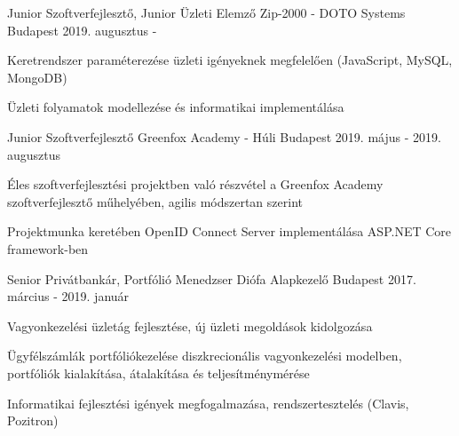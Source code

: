 

\begin{cventries}

  \cventry
    {Junior Szoftverfejlesztő, Junior Üzleti Elemző} %
    {Zip-2000 - DOTO Systems} %
    {Budapest} %
    {2019. augusztus - } %
    {
      \begin{cvitems} %
        \item {Keretrendszer paraméterezése üzleti igényeknek megfelelően (JavaScript, MySQL, MongoDB)}
        \item {Üzleti folyamatok modellezése és informatikai implementálása}
      \end{cvitems}
    }

  \cventry
    {Junior Szoftverfejlesztő} %
    {Greenfox Academy - Húli} %
    {Budapest} %
    {2019. május - 2019. augusztus } %
    {
      \begin{cvitems} %
        \item {Éles szoftverfejlesztési projektben való részvétel a Greenfox Academy szoftverfejlesztő műhelyében, agilis módszertan szerint}
        \item {Projektmunka keretében OpenID Connect Server implementálása ASP.NET Core framework-ben}
      \end{cvitems}
    }  

  \cventry
    {Senior Privátbankár, Portfólió Menedzser} %
    {Diófa Alapkezelő} %
    {Budapest} %
    {2017. március - 2019. január} %
    {
      \begin{cvitems} %
        \item {Vagyonkezelési üzletág fejlesztése, új üzleti megoldások kidolgozása}
        \item {Ügyfélszámlák portfóliókezelése diszkrecionális vagyonkezelési modelben, portfóliók kialakítása, átalakítása és teljesítménymérése}
        \item {Informatikai fejlesztési igények megfogalmazása, rendszertesztelés (Clavis, Pozitron)}
      \end{cvitems}
    }


\end{cventries}
